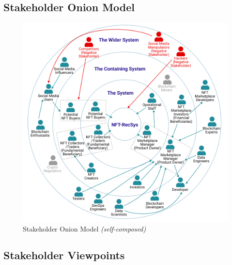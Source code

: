 \subsection{Stakeholder Onion Model}
\begin{figure}[h!]
\centering
\includegraphics[width=\textwidth]{images/SRS/stakeholder-onion-diagram.png}
\caption{Stakeholder Onion Model \textit{(self-composed)}}
\label{fig:stakeholder-onion}
\end{figure}

\pagebreak
\subsection{Stakeholder Viewpoints}

\vspace{-4mm}       %

